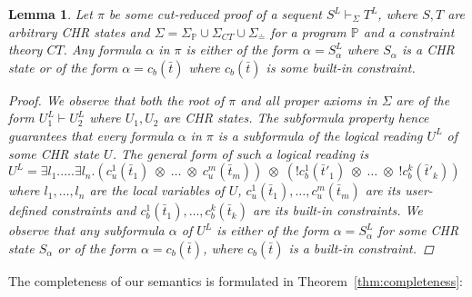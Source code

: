 \documentclass[acmtocl]{acmtrans2m}
\newtheorem{lemma}[theorem]{Lemma}
\newcommand{\bbP}{\ensuremath{\mathbb{P}}}
\newcommand{\Sct}{\ensuremath{\Sigma_{CT}}}
\newcommand{\Seq}{\ensuremath{\Sigma_{\doteq}}}
\newcommand{\Sp}{\ensuremath{\Sigma_\mathbb{P}}}
\newcommand{\bt}{\bar{t}}
\renewcommand{\bt}{\bar{t}}
\newcommand{\x}{{\;\otimes\;}}
\begin{document}
\begin{lemma}
\label{lemma:proof-structure}
Let $\pi$ be some cut-reduced proof of a sequent $S^L\vdash_\Sigma T^L$, where
$S,T$ are arbitrary CHR states and $\Sigma=\Sp\cup\Sct\cup\Seq$ for a program
$\bbP$ and a constraint theory $CT$. Any formula $\alpha$ in $\pi$ is either of the form
$\alpha=S_\alpha^L$ where $S_\alpha$ is a CHR state or of the form
$\alpha=c_b(\bt)$ where $c_b(\bt)$ is some built-in constraint.
\begin{proof}
We observe that both the root of $\pi$ and all proper axioms in $\Sigma$ are of
the form $U_1^L\vdash U_2^L$ where $U_1,U_2$ are CHR states. The subformula property hence
guarantees that every formula $\alpha$ in $\pi$ is a subformula of the logical
reading $U^L$ of some CHR state $U$. The general form of such a logical reading
is $U^L=\exists l_1.\ldots.\exists l_n.(c^1_u(\bt_1)\x\ldots\x c^m_u(\bt_m))\x
(!c^1_b(\bt'_1)\x\ldots\x !c^k_b(\bt'_k))$ where $l_1,\ldots,l_n$ are the local
variables of $U$, $c^1_u(\bt_1),\ldots, c^m_u(\bt_m)$ are its user-defined
constraints and $c^1_b(\bt_1),\ldots, c^k_b(\bt_k)$ are its built-in constraints.
We observe that any subformula $\alpha$ of $U^L$ is either of the form
$\alpha=S_\alpha^L$ for some CHR state $S_\alpha$ or of the form
$\alpha=c_b(\bt)$, where $c_b(\bt)$ is a built-in constraint.
\end{proof}
\end{lemma}

The completeness of our semantics is formulated in
Theorem~\ref{thm:completeness}:
\end{document}
